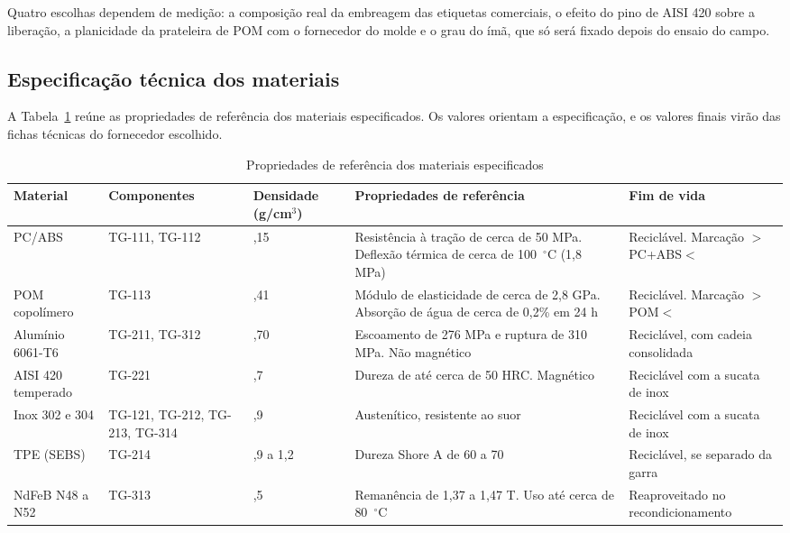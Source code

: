Quatro escolhas dependem de medição: a composição real da embreagem das etiquetas comerciais, o efeito do pino de AISI 420 sobre a liberação, a planicidade da prateleira de POM com o fornecedor do molde e o grau do ímã, que só será fixado depois do ensaio do campo.

\subsection{Especificação técnica dos materiais}
\label{subsec:const_especificacao}

A Tabela~\ref{tab:const_especificacao} reúne as propriedades de referência dos materiais especificados. Os valores orientam a especificação, e os valores finais virão das fichas técnicas do fornecedor escolhido.

\begin{table}[htbp]
    \centering
    \caption{Propriedades de referência dos materiais especificados}
    \label{tab:const_especificacao}
    \footnotesize
    \renewcommand{\arraystretch}{1.3}
    \begin{tabularx}{\textwidth}{@{}
        >{\RaggedRight\arraybackslash}p{2.6cm}
        >{\RaggedRight\arraybackslash}p{2.6cm}
        >{\centering\arraybackslash}p{1.6cm}
        >{\RaggedRight\arraybackslash}X
        >{\RaggedRight\arraybackslash}p{3.0cm}@{}}
        \toprule
        \textbf{Material} & \textbf{Componentes} & \textbf{Densidade (g/cm$^3$)} & \textbf{Propriedades de referência} & \textbf{Fim de vida} \\
        \midrule
        PC/ABS & TG-111, TG-112 & 1,15 & Resistência à tração de cerca de 50 MPa. Deflexão térmica de cerca de 100~$^\circ$C (1,8 MPa) & Reciclável. Marcação $>$PC+ABS$<$ \\
        POM copolímero & TG-113 & 1,41 & Módulo de elasticidade de cerca de 2,8 GPa. Absorção de água de cerca de 0,2\% em 24 h & Reciclável. Marcação $>$POM$<$ \\
        Alumínio 6061-T6 & TG-211, TG-312 & 2,70 & Escoamento de 276 MPa e ruptura de 310 MPa. Não magnético & Reciclável, com cadeia consolidada \\
        AISI 420 temperado & TG-221 & 7,7 & Dureza de até cerca de 50 HRC. Magnético & Reciclável com a sucata de inox \\
        Inox 302 e 304 & TG-121, TG-212, TG-213, TG-314 & 7,9 & Austenítico, resistente ao suor & Reciclável com a sucata de inox \\
        TPE (SEBS) & TG-214 & 0,9 a 1,2 & Dureza Shore A de 60 a 70 & Reciclável, se separado da garra \\
        NdFeB N48 a N52 & TG-313 & 7,5 & Remanência de 1,37 a 1,47 T. Uso até cerca de 80~$^\circ$C & Reaproveitado no recondicionamento \\
        \bottomrule
    \end{tabularx}
\end{table}

